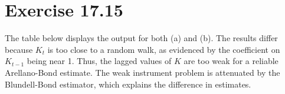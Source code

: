 \documentclass{article}
\begin{document}
\section*{Exercise 17.15}
The table below displays the output for both (a) and (b). The results differ because $K_t$ is too close to a random walk, as evidenced by the coefficient on $K_{t-1}$ being near 1. Thus, the lagged values of $K$ are too weak for a reliable Arellano-Bond estimate. The weak instrument problem is attenuated by the Blundell-Bond estimator, which explains the difference in estimates.
\begin{center}
	
\end{center}

\end{document}
